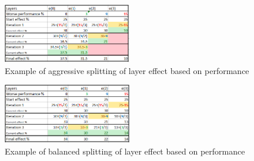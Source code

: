 \begin{figure}
    \includegraphics[width=0.5\textwidth]{figures/fredsplit/aggresiveAlgo.png}
    \centering
    \caption{Example of aggressive splitting of layer effect based on performance}
    \label{fig:fredsplitAgg}
\end{figure}

\begin{figure}
    \includegraphics[width=0.5\textwidth]{figures/fredsplit/balancedAlgo.png}
    \centering
    \caption{Example of balanced splitting of layer effect based on performance}
    \label{fig:fredsplitBal}
\end{figure}





